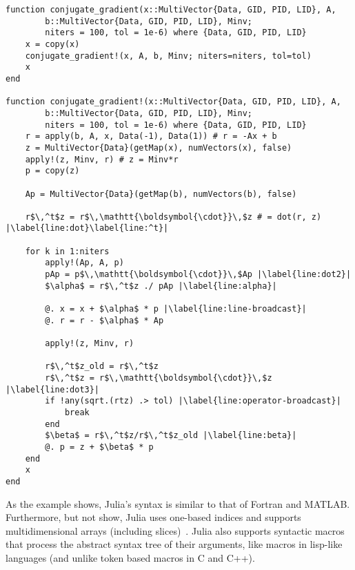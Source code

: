 \documentclass[acmsmall]{acmart}
\begin{document}
	\begin{lstlisting}[float,
						caption=Preconditioned Conjugate Gradient in JuliaPetra,
						label=lst:JP-PCG,
						escapechar=|]
function conjugate_gradient(x::MultiVector{Data, GID, PID, LID}, A,
        b::MultiVector{Data, GID, PID, LID}, Minv;
        niters = 100, tol = 1e-6) where {Data, GID, PID, LID}
    x = copy(x)
    conjugate_gradient!(x, A, b, Minv; niters=niters, tol=tol)
    x
end

function conjugate_gradient!(x::MultiVector{Data, GID, PID, LID}, A,
        b::MultiVector{Data, GID, PID, LID}, Minv;
        niters = 100, tol = 1e-6) where {Data, GID, PID, LID}
    r = apply(b, A, x, Data(-1), Data(1)) # r = -Ax + b
    z = MultiVector{Data}(getMap(x), numVectors(x), false)
    apply!(z, Minv, r) # z = Minv*r
    p = copy(z)

    Ap = MultiVector{Data}(getMap(b), numVectors(b), false)

    r$\,^t$z = r$\,\mathtt{\boldsymbol{\cdot}}\,$z # = dot(r, z) |\label{line:dot}\label{line:^t}|

    for k in 1:niters
        apply!(Ap, A, p)
        pAp = p$\,\mathtt{\boldsymbol{\cdot}}\,$Ap |\label{line:dot2}|
        $\alpha$ = r$\,^t$z ./ pAp |\label{line:alpha}|

        @. x = x + $\alpha$ * p |\label{line:line-broadcast}|
        @. r = r - $\alpha$ * Ap

        apply!(z, Minv, r)

        r$\,^t$z_old = r$\,^t$z
        r$\,^t$z = r$\,\mathtt{\boldsymbol{\cdot}}\,$z |\label{line:dot3}|
        if !any(sqrt.(rtz) .> tol) |\label{line:operator-broadcast}|
            break
        end
        $\beta$ = r$\,^t$z/r$\,^t$z_old |\label{line:beta}|
        @. p = z + $\beta$ * p
    end
    x
end
	\end{lstlisting}
	
	As the example shows, Julia's syntax is similar to that of Fortran and MATLAB.
	Furthermore, but not show, Julia uses one-based indices and supports multidimensional arrays (including slices)~\cite{Bezanson:2017:FreshApproach}.
	Julia also supports syntactic macros that process the abstract syntax tree of their arguments, like macros in lisp-like languages (and unlike token based macros in C and C++).
	
\end{document}

